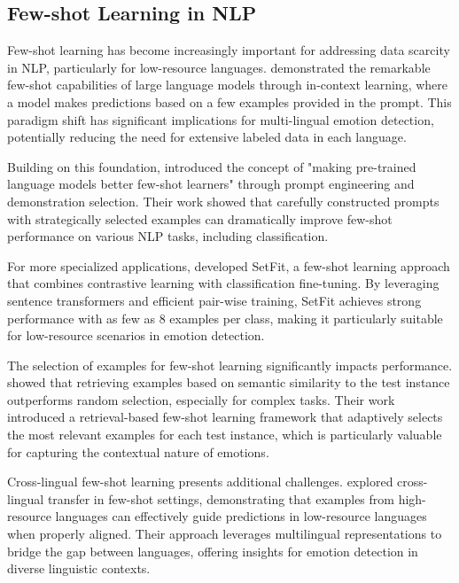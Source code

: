 \documentclass[a4paper,12pt]{extarticle}
\begin{document}
\subsection{Few-shot Learning in NLP}

Few-shot learning has become increasingly important for addressing data scarcity in NLP, particularly for low-resource languages. \cite{brown2020language} demonstrated the remarkable few-shot capabilities of large language models through in-context learning, where a model makes predictions based on a few examples provided in the prompt. This paradigm shift has significant implications for multi-lingual emotion detection, potentially reducing the need for extensive labeled data in each language.

Building on this foundation, \cite{gao2021making} introduced the concept of "making pre-trained language models better few-shot learners" through prompt engineering and demonstration selection. Their work showed that carefully constructed prompts with strategically selected examples can dramatically improve few-shot performance on various NLP tasks, including classification.

For more specialized applications, \cite{tunstall2022efficient} developed SetFit, a few-shot learning approach that combines contrastive learning with classification fine-tuning. By leveraging sentence transformers and efficient pair-wise training, SetFit achieves strong performance with as few as 8 examples per class, making it particularly suitable for low-resource scenarios in emotion detection.

The selection of examples for few-shot learning significantly impacts performance. \cite{liu2022few} showed that retrieving examples based on semantic similarity to the test instance outperforms random selection, especially for complex tasks. Their work introduced a retrieval-based few-shot learning framework that adaptively selects the most relevant examples for each test instance, which is particularly valuable for capturing the contextual nature of emotions.

Cross-lingual few-shot learning presents additional challenges. \cite{zhao2021multi} explored cross-lingual transfer in few-shot settings, demonstrating that examples from high-resource languages can effectively guide predictions in low-resource languages when properly aligned. Their approach leverages multilingual representations to bridge the gap between languages, offering insights for emotion detection in diverse linguistic contexts.
\end{document}
